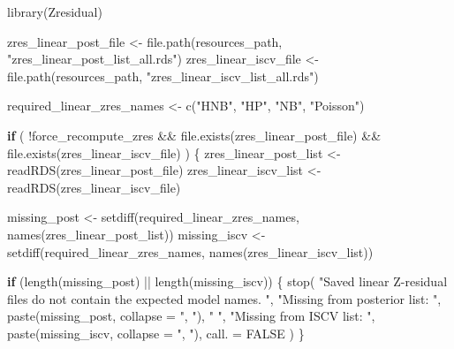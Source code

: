 \documentclass[
  english,
  letterpaper,
  DIV=11,
  numbers=noendperiod]{scrartcl}
\newenvironment{Shaded}{\begin{snugshade}}{\end{snugshade}}
\newcommand{\AttributeTok}[1]{\textcolor[rgb]{0.40,0.45,0.13}{#1}}
\newcommand{\ConstantTok}[1]{\textcolor[rgb]{0.56,0.35,0.01}{#1}}
\newcommand{\ControlFlowTok}[1]{\textcolor[rgb]{0.00,0.23,0.31}{\textbf{#1}}}
\newcommand{\FunctionTok}[1]{\textcolor[rgb]{0.28,0.35,0.67}{#1}}
\newcommand{\NormalTok}[1]{\textcolor[rgb]{0.00,0.23,0.31}{#1}}
\newcommand{\OtherTok}[1]{\textcolor[rgb]{0.00,0.23,0.31}{#1}}
\newcommand{\SpecialCharTok}[1]{\textcolor[rgb]{0.37,0.37,0.37}{#1}}
\newcommand{\StringTok}[1]{\textcolor[rgb]{0.13,0.47,0.30}{#1}}
\begin{document}
\begin{Shaded}
\begin{Highlighting}[]
\FunctionTok{library}\NormalTok{(Zresidual)}

\NormalTok{zres\_linear\_post\_file }\OtherTok{\textless{}{-}} \FunctionTok{file.path}\NormalTok{(resources\_path, }\StringTok{"zres\_linear\_post\_list\_all.rds"}\NormalTok{)}
\NormalTok{zres\_linear\_iscv\_file }\OtherTok{\textless{}{-}} \FunctionTok{file.path}\NormalTok{(resources\_path, }\StringTok{"zres\_linear\_iscv\_list\_all.rds"}\NormalTok{)}

\NormalTok{required\_linear\_zres\_names }\OtherTok{\textless{}{-}} \FunctionTok{c}\NormalTok{(}\StringTok{"HNB"}\NormalTok{, }\StringTok{"HP"}\NormalTok{, }\StringTok{"NB"}\NormalTok{, }\StringTok{"Poisson"}\NormalTok{)}

\ControlFlowTok{if}\NormalTok{ (}
  \SpecialCharTok{!}\NormalTok{force\_recompute\_zres }\SpecialCharTok{\&\&}
    \FunctionTok{file.exists}\NormalTok{(zres\_linear\_post\_file) }\SpecialCharTok{\&\&}
    \FunctionTok{file.exists}\NormalTok{(zres\_linear\_iscv\_file)}
\NormalTok{) \{}
\NormalTok{  zres\_linear\_post\_list }\OtherTok{\textless{}{-}} \FunctionTok{readRDS}\NormalTok{(zres\_linear\_post\_file)}
\NormalTok{  zres\_linear\_iscv\_list }\OtherTok{\textless{}{-}} \FunctionTok{readRDS}\NormalTok{(zres\_linear\_iscv\_file)}

\NormalTok{  missing\_post }\OtherTok{\textless{}{-}} \FunctionTok{setdiff}\NormalTok{(required\_linear\_zres\_names, }\FunctionTok{names}\NormalTok{(zres\_linear\_post\_list))}
\NormalTok{  missing\_iscv }\OtherTok{\textless{}{-}} \FunctionTok{setdiff}\NormalTok{(required\_linear\_zres\_names, }\FunctionTok{names}\NormalTok{(zres\_linear\_iscv\_list))}

  \ControlFlowTok{if}\NormalTok{ (}\FunctionTok{length}\NormalTok{(missing\_post) }\SpecialCharTok{||} \FunctionTok{length}\NormalTok{(missing\_iscv)) \{}
    \FunctionTok{stop}\NormalTok{(}
      \StringTok{"Saved linear Z{-}residual files do not contain the expected model names.}
\StringTok{"}\NormalTok{,}
      \StringTok{"Missing from posterior list: "}\NormalTok{, }\FunctionTok{paste}\NormalTok{(missing\_post, }\AttributeTok{collapse =} \StringTok{", "}\NormalTok{), }\StringTok{"}
\StringTok{"}\NormalTok{,}
      \StringTok{"Missing from ISCV list: "}\NormalTok{, }\FunctionTok{paste}\NormalTok{(missing\_iscv, }\AttributeTok{collapse =} \StringTok{", "}\NormalTok{),}
      \AttributeTok{call. =} \ConstantTok{FALSE}
\NormalTok{    )}
\NormalTok{  \}}


\end{Highlighting}
\end{Shaded}
\end{document}
